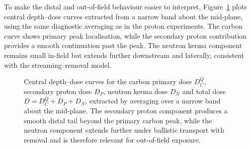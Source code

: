 \documentclass[final]{amsart}
\begin{document}
To make the distal and out-of-field behaviour easier to interpret,
Figure~\ref{fig:carbon_multispecies_depthdose} plots central depth--dose
curves extracted from a narrow band about the mid-plane, using the same
diagnostic averaging as in the proton experiments. The carbon curve
shows primary peak localisation, while the secondary proton contribution
provides a smooth continuation past the peak. The neutron kerma component
remains small in-field but extends further downstream and laterally,
consistent with the streaming--removal model.

\begin{figure}[h!]
  \centering

  \depthdosedata


  \caption{\label{fig:carbon_multispecies_depthdose} Central
    depth--dose curves for the carbon primary dose $D_C^{Q}$,
    secondary proton dose $D_P$, neutron kerma dose $D_N$ and total
    dose $D=D_C^{Q}+D_P+D_N$, extracted by averaging over a narrow
    band about the mid-plane. The secondary proton component produces
    a smooth distal tail beyond the primary carbon peak, while the
    neutron component extends further under ballistic transport with
    removal and is therefore relevant for out-of-field exposure.}
\end{figure}
\end{document}
